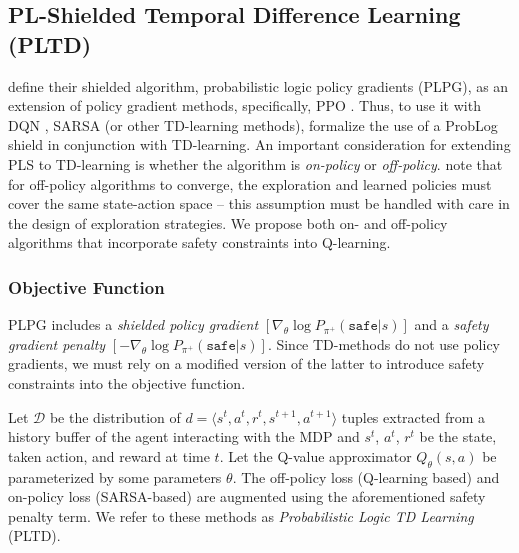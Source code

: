\documentclass{ecai}
\theoremstyle{plain}
\theoremstyle{definition}
\theoremstyle{remark}
\begin{document}
\subsection{PL-Shielded Temporal Difference Learning (PLTD)}\label{sec:methods:pltd}
\citet{yang2023safe} define their shielded algorithm, probabilistic logic policy gradients (PLPG), as an extension of policy gradient methods, specifically, PPO \citep{schulman2017proximal}. Thus, to use it with DQN \citep{mnih2013playing}, SARSA \citep{zhao2016deep} (or other TD-learning methods), formalize the use of a ProbLog shield in conjunction with TD-learning. An important consideration for extending PLS to TD-learning is whether the algorithm is \textit{on-policy} or \textit{off-policy}. \citet{yang2023safe} note that for off-policy algorithms to converge, the exploration and learned policies must cover the same state-action space -- this assumption must be handled with care in the design of exploration strategies. We propose both on- and off-policy algorithms that incorporate safety constraints into Q-learning.


\subsubsection{Objective Function}
PLPG includes a \textit{shielded policy gradient} $[\nabla_\theta\log P_{\pi^+}(\mathtt{safe}|s)]$ and a \textit{safety gradient penalty} $[-\nabla_\theta\log P_{\pi^+}(\mathtt{safe}|s)]$. Since TD-methods do not use policy gradients, we must rely on a modified version of the latter to introduce safety constraints into the objective function.

Let $\mathcal{D}$ be the distribution of $d=\langle s^t,a^t,r^t,s^{t+1},a^{t+1}\rangle$ tuples extracted from a history buffer of the agent interacting with the MDP and $s^t$, $a^t$, $r^t$ be the state, taken action, and reward at time $t$. Let the Q-value approximator $Q_\theta(s,a)$ be parameterized by some parameters $\theta$. The off-policy loss (Q-learning based) and on-policy loss (SARSA-based) are augmented using the aforementioned safety penalty term. We refer to these methods as \textit{Probabilistic Logic TD Learning} (PLTD).
\end{document}
